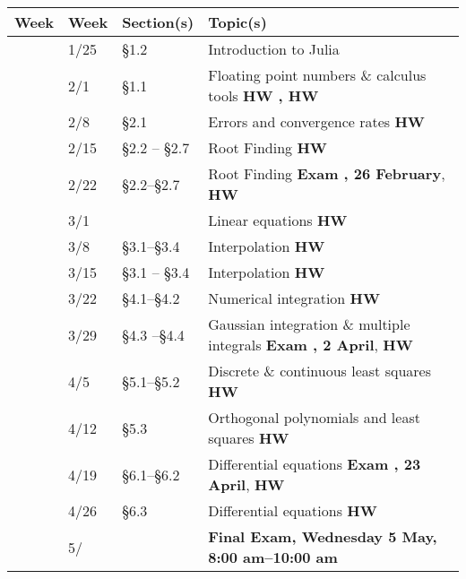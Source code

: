 \documentclass[12pt,fullpage]{article}
\newcounter{qz}\setcounter{qz}{0}
\newcommand{\qz}{%
\setcounter{qz}{\value{qz}+1}
\theqz}
\newcounter{ex}\setcounter{ex}{0}
\newcommand{\ex}{%
\setcounter{ex}{\value{ex}+1}
Exam \theex}
\newcounter{wk}\setcounter{wk}{0}
\newcommand{\wk}{%
\setcounter{wk}{\value{wk}+1}
\thewk \,\,}
\begin{document}
\begin{center}

\begin{tabular}  {|l|l|l|l|}
\hline
{\bf Week}  & {\bf Week} &  {\bf Section(s)} & {\bf Topic(s)} \\
\hline \hline 
\wk    & 1/25 &    \S1.2   &   Introduction to Julia   \hfill \\
\wk    & 2/1 & \S1.1      &  Floating point numbers \& calculus tools   \hfill \textbf{HW  \qz,  HW \qz} \\
\wk    & 2/8 &    \S2.1 & Errors and convergence rates    \hfill \textbf{HW  \qz} \\
\wk    & 2/15  & \S2.2 -- \S2.7 &  Root Finding   \hfill  \textbf{HW \qz} \\
\wk    & 2/22 &  \S2.2--\S2.7   &  Root Finding    \hfill \textbf{\ex\-\-, 26 February},  \textbf{HW  \qz  }   \\
\wk    & 3/1    &  &  Linear equations  \hfill  \textbf{HW  \qz }  \\
\wk    & 3/8     & \S3.1--\S3.4 & Interpolation \hfill \textbf{ HW  \qz }   \\
\wk   & 3/15   & \S3.1 -- \S3.4   &   Interpolation   \hfill \textbf{ HW  \qz} \\
\wk  &  3/22    & \S4.1--\S4.2 &  Numerical  integration  \hfill \textbf{HW  \qz}     \hfill \\
\wk &  3/29     &   \S4.3 --\S4.4 &   Gaussian integration \& multiple integrals    \hfill \textbf{\ex\-\-, 2 April},  \textbf{HW  \qz  }  \\
\wk  & 4/5 &   \S5.1--\S5.2 & Discrete \& continuous least squares  \hfill \textbf{HW    \qz} \\
\wk   & 4/12  & \S5.3 &  Orthogonal polynomials and least squares  \hfill \textbf{HW \qz}   \\
\wk   & 4/19   & \S6.1--\S6.2   & Differential equations \hfill  \textbf{ \ex, 23 April},  \textbf{HW  \qz  }     \\
\wk   & 4/26   &  \S6.3   & Differential equations   \hfill \textbf{ HW \qz  } \\
\wk   & 5/       &  &   \textbf{Final Exam, Wednesday 5 May, 8:00 am--10:00 am} \\ \hline
\end{tabular}
\end{center}
\end{document}
